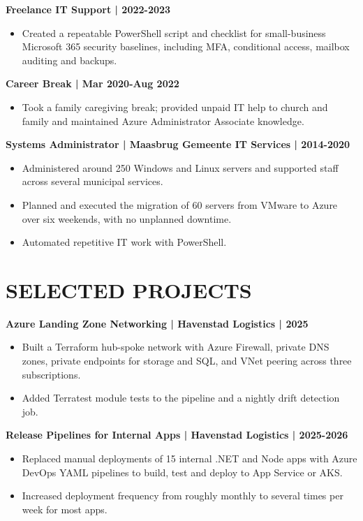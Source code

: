 \documentclass[11pt,a4paper]{article}
\begin{document}
\textbf{Freelance IT Support | 2022-2023}
\begin{itemize}
\item Created a repeatable PowerShell script and checklist for small-business Microsoft 365 security baselines, including MFA, conditional access, mailbox auditing and backups.
\end{itemize}

\textbf{Career Break | Mar 2020-Aug 2022}
\begin{itemize}
\item Took a family caregiving break; provided unpaid IT help to church and family and maintained Azure Administrator Associate knowledge.
\end{itemize}

\textbf{Systems Administrator | Maasbrug Gemeente IT Services | 2014-2020}
\begin{itemize}
\item Administered around 250 Windows and Linux servers and supported staff across several municipal services.
\item Planned and executed the migration of 60 servers from VMware to Azure over six weekends, with no unplanned downtime.
\item Automated repetitive IT work with PowerShell.
\end{itemize}

\section*{SELECTED PROJECTS}
\textbf{Azure Landing Zone Networking | Havenstad Logistics | 2025}
\begin{itemize}
\item Built a Terraform hub-spoke network with Azure Firewall, private DNS zones, private endpoints for storage and SQL, and VNet peering across three subscriptions.
\item Added Terratest module tests to the pipeline and a nightly drift detection job.
\end{itemize}

\textbf{Release Pipelines for Internal Apps | Havenstad Logistics | 2025-2026}
\begin{itemize}
\item Replaced manual deployments of 15 internal .NET and Node apps with Azure DevOps YAML pipelines to build, test and deploy to App Service or AKS.
\item Increased deployment frequency from roughly monthly to several times per week for most apps.
\end{itemize}
\end{document}
